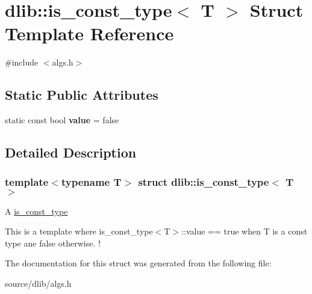 \hypertarget{structdlib_1_1is__const__type}{
\section{dlib::is\_\-const\_\-type$<$ T $>$ Struct Template Reference}
\label{structdlib_1_1is__const__type}
}


{\ttfamily \#include $<$algs.h$>$}\subsection*{Static Public Attributes}
\begin{DoxyCompactItemize}
\item 
\hypertarget{structdlib_1_1is__const__type_a14ab4b30a04eecf9108c5a8f898fcb22}{
static const bool {\bfseries value} = false}
\label{structdlib_1_1is__const__type_a14ab4b30a04eecf9108c5a8f898fcb22}

\end{DoxyCompactItemize}


\subsection{Detailed Description}
\subsubsection*{template$<$typename T$>$ struct dlib::is\_\-const\_\-type$<$ T $>$}

A \hyperlink{structdlib_1_1is__const__type}{is\_\-const\_\-type}

This is a template where is\_\-const\_\-type$<$T$>$::value == true when T is a const type ane false otherwise. ! 

The documentation for this struct was generated from the following file:\begin{DoxyCompactItemize}
\item 
source/dlib/algs.h\end{DoxyCompactItemize}
